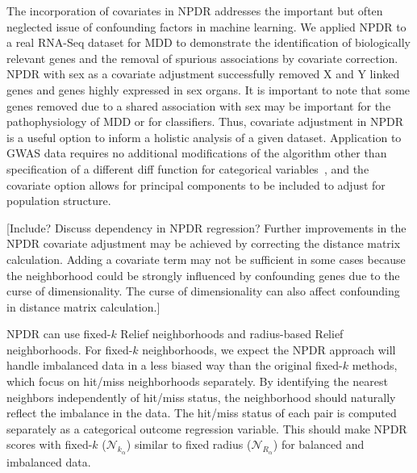 \documentclass[10pt]{article}
\begin{document}
The incorporation of covariates in NPDR addresses the important but often neglected issue of confounding factors in machine learning. We applied NPDR to a real RNA-Seq dataset for MDD to demonstrate the identification of biologically relevant genes and the removal of spurious associations by covariate correction. NPDR with sex as a covariate adjustment successfully removed X and Y linked genes and genes highly expressed in sex organs. It is important to note that some genes removed due to a shared association with sex may be important for the pathophysiology of MDD or for classifiers.  Thus, covariate adjustment in NPDR is a useful option to inform a holistic analysis of a given dataset. Application to GWAS data requires no additional modifications of the algorithm other than specification of a different diff function for categorical variables~\cite{titv}, and the covariate option allows for principal components to be included to adjust for population structure. 

[Include? Discuss dependency in NPDR regression? Further improvements in the NPDR covariate adjustment may be achieved by correcting the distance matrix calculation. Adding a covariate term may not be sufficient in some cases because the neighborhood could be strongly influenced by confounding genes due to the curse of dimensionality. The curse of dimensionality can also affect confounding in distance matrix calculation.]

NPDR can use fixed-$k$ Relief neighborhoods and radius-based Relief neighborhoods. For fixed-$k$ neighborhoods, we expect the NPDR approach will handle imbalanced data in a less biased way than the original fixed-$k$ methods, which focus on hit/miss neighborhoods separately. By identifying the nearest neighbors independently of hit/miss status, the neighborhood should naturally reflect the imbalance in the data. The hit/miss status of each pair is computed separately as a categorical outcome regression variable. This should make NPDR scores with fixed-$k$ ($\mathcal{N}_{k_\alpha}$) similar to fixed radius ($\mathcal{N}_{R_\alpha}$) for balanced and imbalanced data.    

\end{document}
